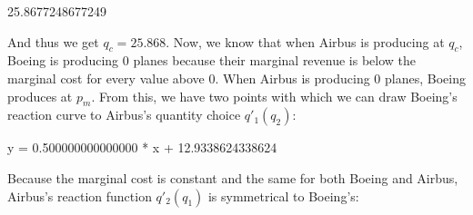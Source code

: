 \documentclass[letterpaper,10pt,english]{jupyterBook}
\begin{document}
\begin{sphinxVerbatim}[commandchars=\\\{\}]
  
      
    
\end{sphinxVerbatim}

\begin{sphinxVerbatim}[commandchars=\\\{\}]
25.8677248677249
\end{sphinxVerbatim}

\sphinxAtStartPar
And thus we get \(q_c = 25.868\). Now, we know that when Airbus is producing at \(q_c\), Boeing is producing 0 planes because their marginal revenue is below the marginal cost for every value above 0. When Airbus is producing 0 planes, Boeing produces at \(p_m\). From this, we have two points with which we can draw Boeing’s reaction curve to Airbus’s quantity choice \(q'_1(q_2)\):

\begin{sphinxVerbatim}[commandchars=\\\{\}]
    
    

        
      

\end{sphinxVerbatim}

\begin{sphinxVerbatim}[commandchars=\\\{\}]
y = \PYGZhy{}0.500000000000000 * x + 12.9338624338624
\end{sphinxVerbatim}

\sphinxAtStartPar
Because the marginal cost is constant and the same for both Boeing and Airbus, Airbus’s reaction function \(q'_2(q_1)\) is symmetrical to Boeing’s:
\end{document}
